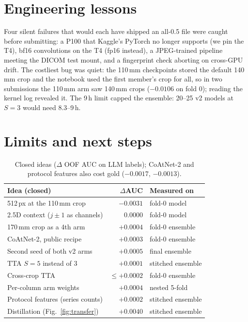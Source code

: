 \documentclass[10pt,twocolumn]{article}
\begin{document}
\section{Engineering lessons}

Four silent failures that would each have shipped an all-0.5 file were caught before submitting: a P100 that
Kaggle's PyTorch no longer supports (we pin the T4), bf16 convolutions on the T4 (fp16 instead), a JPEG-trained
pipeline meeting the DICOM test mount, and a fingerprint check aborting on cross-GPU drift. The
costliest bug was quiet: the 110\,mm checkpoints stored the default 140\,mm crop and the notebook used the first
member's crop for all, so in two submissions the 110\,mm arm saw 140\,mm crops ($-0.0106$ on fold 0); reading the
kernel log revealed it. The 9\,h limit capped the ensemble: 20--25 v2 models at $S{=}3$ would need 8.3--9\,h.

\section{Limits and next steps}

\begin{table}[t]
\centering\footnotesize
\setlength{\tabcolsep}{4pt}
\begin{tabular}{@{}lrl@{}}
\toprule
\textbf{Idea (closed)} & \textbf{$\Delta$AUC} & \textbf{Measured on} \\
\midrule
512\,px at the 110\,mm crop & $-0.0031$ & fold-0 model \\
2.5D context ($j\pm1$ as channels) & $0.0000$ & fold-0 model \\
170\,mm crop as a 4th arm & $+0.0004$ & fold-0 ensemble \\
CoAtNet-2, public recipe & $+0.0003$ & fold-0 ensemble \\
Second seed of both v2 arms & $+0.0005$ & final ensemble \\
TTA $S{=}5$ instead of 3 & $+0.0001$ & stitched ensemble \\
Cross-crop TTA & $\leq{+0.0002}$ & fold-0 ensemble \\
Per-column arm weights & $+0.0004$ & nested 5-fold \\
Protocol features (series counts) & $+0.0002$ & stitched ensemble \\
Distillation (Fig.~\ref{fig:transfer}) & $+0.0040$ & stitched ensemble \\
\bottomrule
\end{tabular}
\caption{Closed ideas ($\Delta$ OOF AUC on LLM labels); CoAtNet-2 and protocol features also cost gold ($-0.0017$,
$-0.0013$).}
\label{tab:neg}
\end{table}
\end{document}
